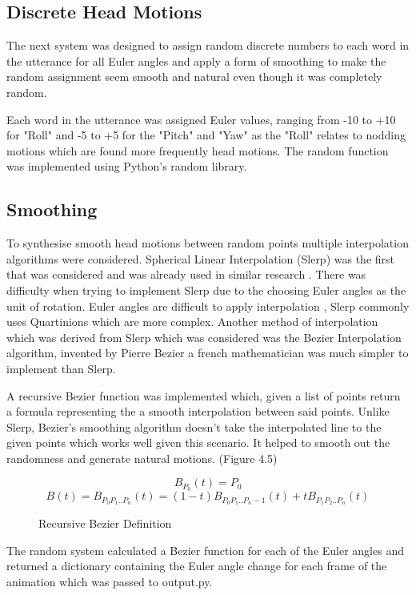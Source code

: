 \documentclass[bsc,frontabs,twoside,singlespacing,parskip]{infthesis}
\begin{document}
\subsection{Discrete Head Motions}

The next system was designed to assign random discrete numbers to each word in the utterance for all Euler angles and apply a form of smoothing to make the random assignment seem smooth and natural even though it was completely random. 

Each word in the utterance was assigned Euler values, ranging from -10 to +10 for "Roll" and -5 to +5 for the "Pitch" and "Yaw" as the "Roll" relates to nodding motions which are found more frequently head motions. The random function was implemented using Python's random library.

\subsection{Smoothing}

To synthesise smooth head motions between random points multiple interpolation algorithms were considered. Spherical Linear Interpolation (Slerp) was the first that was considered and was already used in similar research \cite{rigid_head_motion}. There was difficulty when trying to implement Slerp due to the choosing Euler angles as the unit of rotation. Euler angles are difficult to apply interpolation \cite{quartionions}, Slerp commonly uses Quartinions which are more complex. Another method of interpolation which was derived from Slerp which was considered was the Bezier Interpolation algorithm, invented by Pierre Bezier a french mathematician was much simpler to implement than Slerp.

A recursive Bezier function was implemented which, given a list of points return a formula representing the a smooth interpolation between said points. Unlike Slerp, Bezier's smoothing algorithm doesn't take the interpolated line to the given points which works well given this scenario. It helped to smooth out the randomness and generate natural motions. (Figure 4.5)

\begin{figure}
	$$ B_{P_0}(t) = P_0 $$
	$$ B(t) = B_{P_0P_1..P_n}(t) = (1-t) B_{P_0P_1..P_n-1}(t) + tB_{P_1P_2..P_n} (t)$$
	\caption{Recursive Bezier Definition} 
\end{figure}

The random system calculated a Bezier function for each of the Euler angles and returned a dictionary containing the Euler angle change for each frame of the animation which was passed to output.py.
\end{document}
